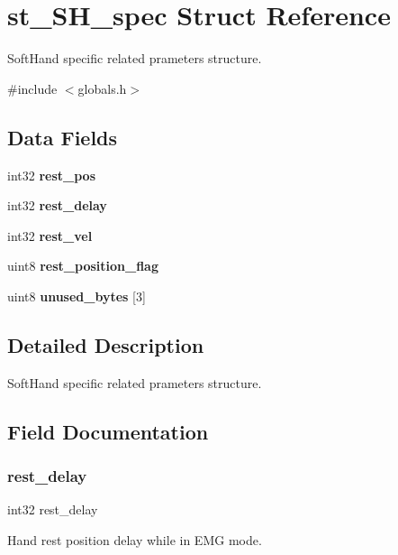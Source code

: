 \section{st\+\_\+\+S\+H\+\_\+spec Struct Reference}
\label{structst___s_h__spec}


Soft\+Hand specific related prameters structure.  




{\ttfamily \#include $<$globals.\+h$>$}

\subsection*{Data Fields}
\begin{DoxyCompactItemize}
\item 
int32 \textbf{ rest\+\_\+pos}
\item 
int32 \textbf{ rest\+\_\+delay}
\item 
int32 \textbf{ rest\+\_\+vel}
\item 
uint8 \textbf{ rest\+\_\+position\+\_\+flag}
\item 
uint8 \textbf{ unused\+\_\+bytes} [3]
\end{DoxyCompactItemize}


\subsection{Detailed Description}
Soft\+Hand specific related prameters structure. 



\subsection{Field Documentation}
\mbox{\label{structst___s_h__spec_a0c8e71bf78005976d2887594a9808eda}} 
\subsubsection{rest\+\_\+delay}
{\footnotesize\ttfamily int32 rest\+\_\+delay}

Hand rest position delay while in E\+MG mode. \mbox{\label{structst___s_h__spec_a27742da1d6ad36d8051848f9e4346146}} 
